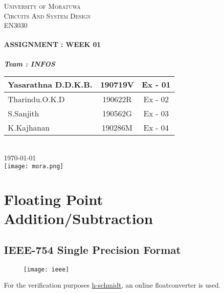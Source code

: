 \documentclass[11pt]{article}
\begin{document}
    \begin{titlepage}
        \center
        \textsc{\LARGE University of Moratuwa}\\[.5cm]

        \textsc{\Large Circuits And System Design}\\[0.2cm]
        \textsc{\large EN3030}\\[1cm]                                        %
        \HRule \\[0.4cm]
        { \Large \bfseries ASSIGNMENT : WEEK 01}\\[0.25cm]
        \HRule \\[1cm]
        \large
        \textbf{\emph{\large Team : INFOS}}\\
        [0.3cm]
        \begin{tabular}{ |l| c|c| }
            \toprule
            Yasarathna D.D.K.B. & 190719V & Ex - 01 \\
            \midrule
            Tharindu.O.K.D      & 190622R & Ex - 02 \\
            \midrule
            S.Sanjith           & 190562G & Ex - 03 \\
            \midrule
            K.Kajhanan          & 190286M & Ex - 04 \\
            \midrule
        \end{tabular}\\
        [.5cm]
        {\large \today}\\[1cm]
        \texttt{[image: mora.png]}\\[1cm]    %
        \tableofcontents
        \vfill
        \HRule
    \end{titlepage}


    \section{Floating Point Addition/Subtraction}

    \subsection{IEEE-754 Single Precision Format}
    \begin{figure}[h]
        \begin{center}
            \texttt{[image: ieee]}
        \end{center}
    \end{figure}
    For the verification purposes \href{https://www.h-schmidt.net/FloatConverter/IEEE754.html}{h-schmidt}, an online floatconverter is used.
\end{document}
